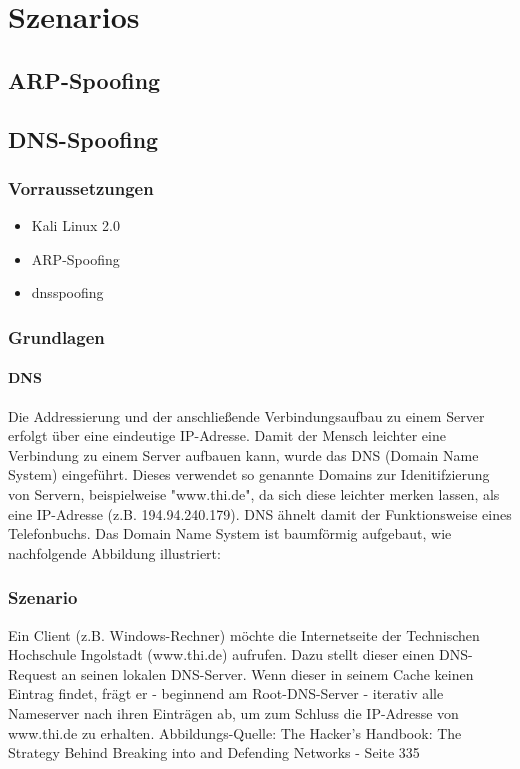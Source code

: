 \chapter{Szenarios}

\section{ARP-Spoofing}

\section{DNS-Spoofing}

\subsection*{Vorraussetzungen}

\begin{itemize}
\item Kali Linux 2.0
\item ARP-Spoofing
\item dnsspoofing
\end{itemize}


\subsection*{Grundlagen}

\subsubsection*{DNS}
Die Addressierung und der anschließende Verbindungsaufbau zu einem Server erfolgt über eine eindeutige IP-Adresse. Damit der Mensch leichter eine Verbindung zu einem Server aufbauen kann,
wurde das DNS (Domain Name System) eingeführt. Dieses verwendet so genannte Domains zur Idenitifzierung von Servern, beispielweise "www.thi.de", da sich diese leichter merken lassen, als
eine IP-Adresse (z.B. 194.94.240.179). DNS ähnelt damit der Funktionsweise eines Telefonbuchs.
Das Domain Name System ist baumförmig aufgebaut, wie nachfolgende Abbildung illustriert: 


\subsection*{Szenario}
Ein Client (z.B. Windows-Rechner) möchte die Internetseite der Technischen Hochschule Ingolstadt (www.thi.de) aufrufen. Dazu stellt dieser einen DNS-Request an seinen lokalen DNS-Server.
Wenn dieser in seinem Cache keinen Eintrag findet, frägt er - beginnend am Root-DNS-Server - iterativ alle Nameserver nach ihren Einträgen ab, um zum Schluss die IP-Adresse von www.thi.de
zu erhalten.
Abbildungs-Quelle: The Hacker's Handbook: The Strategy Behind Breaking into and Defending Networks - Seite 335

